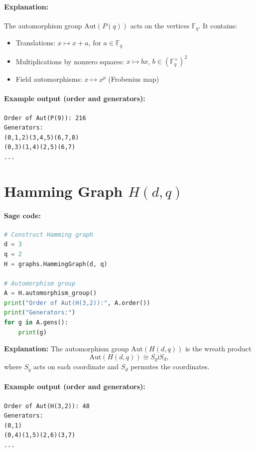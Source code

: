 \documentclass[12pt,a4paper,openany]{book}
\begin{document}
\paragraph{Explanation:}  
The automorphism group $\mathrm{Aut}(P(q))$ acts on the vertices $\mathbb{F}_q$. It contains:

\begin{itemize}
  \item Translations: $x \mapsto x + a$, for $a \in \mathbb{F}_q$
  \item Multiplications by nonzero squares: $x \mapsto b x$, $b \in (\mathbb{F}_q^\times)^2$
  \item Field automorphisms: $x \mapsto x^p$ (Frobenius map)
\end{itemize}


\paragraph{Example output (order and generators):}
\begin{verbatim}
Order of Aut(P(9)): 216
Generators:
(0,1,2)(3,4,5)(6,7,8)
(0,3)(1,4)(2,5)(6,7)
...
\end{verbatim}


\section*{ Hamming Graph $H(d,q)$}

\paragraph{Sage code:}
\begin{lstlisting}[language=Python]
# Construct Hamming graph
d = 3
q = 2
H = graphs.HammingGraph(d, q)

# Automorphism group
A = H.automorphism_group()
print("Order of Aut(H(3,2)):", A.order())
print("Generators:")
for g in A.gens():
    print(g)
\end{lstlisting}

\noindent\textbf{Explanation:}  
The automorphism group $\mathrm{Aut}(H(d,q))$ is the wreath product
\[
\mathrm{Aut}(H(d,q)) \cong S_q \wr S_d,
\]
where $S_q$ acts on each coordinate and $S_d$ permutes the coordinates.

\paragraph{Example output (order and generators):}
\begin{verbatim}
Order of Aut(H(3,2)): 48
Generators:
(0,1)
(0,4)(1,5)(2,6)(3,7)
...
\end{verbatim}
\end{document}
